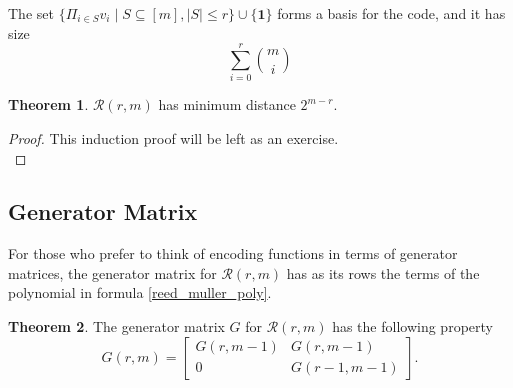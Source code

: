 \documentclass[12pt,twoside]{reedthesis}
\theoremstyle{definition}
\newtheorem{theorem}{Theorem}[chapter]
\begin{document}
The set $\{\Pi_{i \in S}v_i \mid S \subseteq [m], \lvert S \rvert \leq r\} \cup \{\mathbf{1}\}$ forms a basis for the code, and it has size
\begin{equation*}
\sum_{i=0}^{r} {m \choose i}
\end{equation*}

\begin{theorem} 
$\mathscr{R}(r,m)$ has minimum distance $2^{m-r}$.
\end{theorem}
\begin{proof}
This induction proof will be left as an exercise.\\
\end{proof}
\subsection{Generator Matrix}
For those who prefer to think of encoding functions in terms of generator matrices, the generator matrix for $\mathscr{R}(r,m)$ has as its rows the terms of the polynomial in formula \ref{reed_muller_poly}.

\begin{theorem} The generator matrix $G$ for $\mathscr{R}(r,m)$ has the following property
\begin{equation*}
G(r, m) = 
\begin{bmatrix}
G(r, m-1) & G(r, m-1) \\
0 & G(r-1,m-1)
\end{bmatrix} .
\end{equation*}
\end{theorem}
\end{document}

